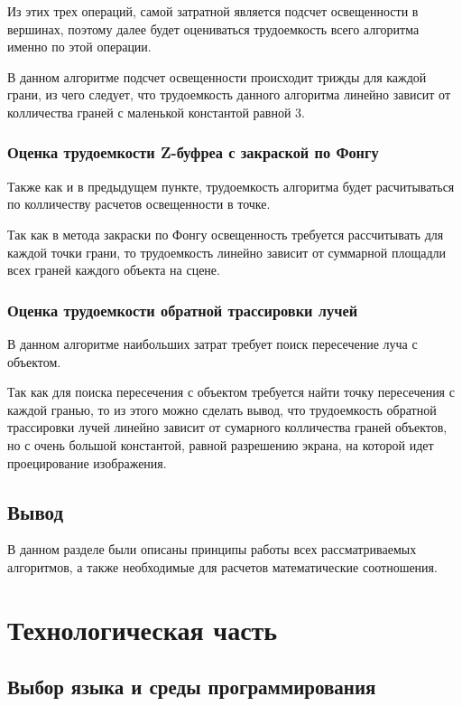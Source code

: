 \documentclass[12pt]{report}
\begin{document}
	Из этих трех операций, самой затратной является подсчет освещенности в вершинах, поэтому далее будет оцениваться трудоемкость всего алгоритма именно по этой операции.
	
	В данном алгоритме подсчет освещенности происходит трижды для каждой грани, из чего следует, что трудоемкость данного алгоритма линейно зависит от колличества граней с маленькой константой равной 3.
	
	\subsection{Оценка трудоемкости Z-буфреа с закраской по Фонгу}
	
	Также как и в предыдущем пункте, трудоемкость алгоритма будет расчитываться по колличеству расчетов освещенности в точке.
	
	Так как в метода закраски по Фонгу освещенность требуется рассчитывать для каждой точки грани, то трудоемкость линейно зависит от суммарной площадли всех граней каждого объекта на сцене.
	
	\subsection{Оценка трудоемкости обратной трассировки лучей}

	В данном алгоритме наибольших затрат требует поиск пересечение луча с объектом.
	
	Так как для поиска пересечения с объектом требуется найти точку пересечения с каждой гранью, то из этого можно сделать вывод, что трудоемкость обратной трассировки лучей линейно зависит от сумарного колличества граней объектов, но с очень большой константой, равной разрешению экрана, на которой идет проецирование изображения.

	\section*{Вывод}

	В данном разделе были описаны принципы работы всех рассматриваемых алгоритмов, а также необходимые для расчетов математические соотношения.
	
	\chapter{Технологическая часть}
	
	\section{Выбор языка и среды программирования}
	
\end{document}
